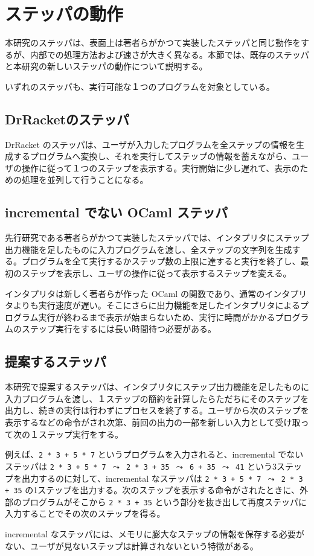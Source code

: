 \section{ステッパの動作}

本研究のステッパは、表面上は著者らがかつて実装したステッパ\cite{FSA18}と同じ動作をするが、内部での処理方法および速さが大きく異なる。本節では、既存のステッパと本研究の新しいステッパの動作について説明する。

いずれのステッパも、実行可能な１つのプログラムを対象としている。

\subsection{DrRacketのステッパ}
\label{ステッパの動作-DrRacketのステッパ}
DrRacket のステッパ\cite{clements01}は、ユーザが入力したプログラムを全ステップの情報を生成するプログラムへ変換し、それを実行してステップの情報を蓄えながら、ユーザの操作に従って１つのステップを表示する。実行開始に少し遅れて、表示のための処理を並列して行うことになる。

\subsection{incremental でない OCaml ステッパ}
\label{ステッパの動作-incrementalでないOCamlステッパ}
先行研究である著者らがかつて実装したステッパ\cite{FSA18}では、インタプリタにステップ出力機能を足したものに入力プログラムを渡し、全ステップの文字列を生成する。プログラムを全て実行するかステップ数の上限に達すると実行を終了し、最初のステップを表示し、ユーザの操作に従って表示するステップを変える。

インタプリタは新しく著者らが作った OCaml の関数であり、通常のインタプリタよりも実行速度が遅い。そこにさらに出力機能を足したインタプリタによるプログラム実行が終わるまで表示が始まらないため、実行に時間がかかるプログラムのステップ実行をするには長い時間待つ必要がある。

\subsection{提案するステッパ}
\label{ステッパの動作-提案するステッパ}

本研究で提案するステッパは、インタプリタにステップ出力機能を足したものに入力プログラムを渡し、１ステップの簡約を計算したらただちにそのステップを出力し、続きの実行は行わずにプロセスを終了する。ユーザから次のステップを表示するなどの命令がされ次第、前回の出力の一部を新しい入力として受け取って次の１ステップ実行をする。

例えば、\texttt{2 * 3 + 5 * 7} というプログラムを入力されると、incremental でないステッパは \texttt{2 * 3 + 5 * 7 $\leadsto$ 2 * 3 + 35 $\leadsto$ 6 + 35 $\leadsto$ 41} という3ステップを出力するのに対して、incremental なステッパは \texttt{2 * 3 + 5 * 7 $\leadsto$ 2 * 3 + 35} の1ステップを出力する。次のステップを表示する命令がされたときに、外部のプログラムがそこから \texttt{2 * 3 + 35} という部分を抜き出して再度ステッパに入力することでその次のステップを得る。

incremental なステッパには、メモリに膨大なステップの情報を保存する必要がない、ユーザが見ないステップは計算されないという特徴がある。

